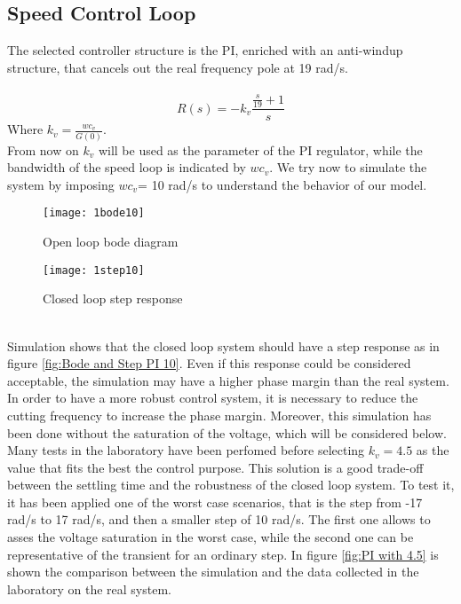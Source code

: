\newpage
\subsection{Speed Control Loop}
The selected controller structure is the PI, enriched with an anti-windup structure, that cancels out the real frequency pole at 19 rad/s. \\
\\
\[
R(s)=-k_v
\frac{\frac{s}{19}+1}{s}
\]
\newline
Where $k_{v}=\frac{wc_{v}}{G(0)}$.
\\
 From now on $k_v$ will be used as the parameter of the PI regulator, while the bandwidth of the speed loop is indicated by $wc_v$. We try now to simulate the system by imposing $wc_v$= 10 rad/s to understand the behavior of our model.
\\
\begin{figure*}[h]
	\centering
	\begin{subfigure}{0.45\columnwidth}
		\texttt{[image: 1bode10]}
		\caption{Open loop bode diagram}
	\end{subfigure}
	\begin{subfigure}{0.45\columnwidth}
		\texttt{[image: 1step10]}
		\caption{Closed loop step response}
	\end{subfigure}
	\caption{Speed control loop with  $wc_{v} $=10 rad/s}
	\label{fig:Bode and Step PI 10}
\end{figure*}
\\
Simulation shows that the closed loop system should have a step response as in figure \ref{fig:Bode and Step PI 10}. 
Even if this response could be considered acceptable, the simulation may have a higher phase margin than the real system. In order to have a more robust control system, it is necessary to reduce the cutting frequency to increase the phase margin. Moreover, this simulation has been done without the saturation of the voltage, which will be considered below.
\newline Many tests in the laboratory have been perfomed before selecting $k_v=4.5$ as the value that fits the best the control purpose. This solution is a good trade-off between the settling time and the robustness of the closed loop system.
To test it, it has been applied one of the worst case scenarios, that is the step from -17 rad/s to 17 rad/s, and then a smaller step of 10 rad/s. The first one allows to asses the voltage saturation in the worst case, while the second one can be representative of the transient for an ordinary step.
In figure \cref{fig:PI with 4.5} is shown the comparison between the simulation and the data collected in the laboratory on the real system.

